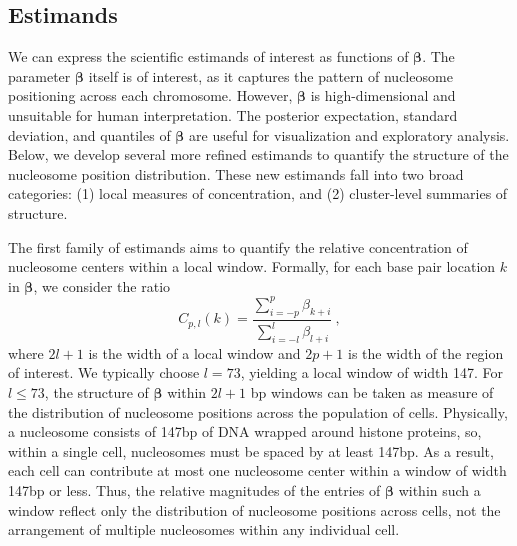\subsection{Estimands}
\label{sec:estimands}

We can express the scientific estimands of interest as functions of $\bm \beta$.
The parameter $\bm \beta$ itself is of interest, as it captures the pattern of nucleosome positioning across each chromosome. However, $\bm \beta$ is  high-dimensional and unsuitable for human interpretation. 
The posterior expectation, standard deviation, and quantiles of $\bm \beta$ are useful for visualization and exploratory analysis.
Below, we develop several more refined estimands to quantify the structure of the nucleosome position distribution.
These new estimands fall into two broad categories:
 (1) local measures of concentration, and
 (2) cluster-level summaries of structure.

The first family of estimands aims to quantify the relative concentration of nucleosome centers within a local window.
Formally, for each base pair location $k$ in $\bm \beta$, we consider the ratio
\begin{equation}
C_{p,l}(k) = \frac{\sum_{i=-p}^{p} \beta_{k + i}}{\sum_{i=-l}^{l} \beta_{l + i}} \label{eq:concentration} \ ,
\end{equation}
where $2l + 1$ is the width of a local window and $2p + 1$ is the width of the region of interest.
We typically choose $l = 73$, yielding a local window of width 147.
%
For $l \leq 73$, the structure of $\bm \beta$ within $2l+1$ bp windows can be taken as measure of the distribution of nucleosome positions across the population of cells.
Physically, a nucleosome consists of 147bp of DNA wrapped around histone proteins, so, within a single cell, nucleosomes must be spaced by at least 147bp.
As a result, each cell can contribute at most one nucleosome center within a window of width 147bp or less.
Thus, the relative magnitudes of the entries of $\bm \beta$ within such a window reflect only the distribution of nucleosome positions across cells, not the arrangement of multiple nucleosomes within any individual cell.


